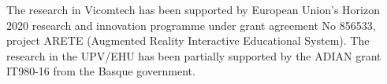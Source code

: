 \documentclass[10pt, a4paper, oneside]{article}
\begin{document}
{\selectfont
\begin{doi}
{\fontsize{9pt}{9pt}\selectfont{
10.3897/jucs.\textless SubmissionNumber\textgreater}}
\end{doi}}






%



\begin{Acknowledgements}
The research in Vicomtech has been supported by European Union’s Horizon 2020 research and innovation programme under grant agreement No 856533, project ARETE (Augmented Reality Interactive Educational System).
The research in the UPV/EHU has been partially supported by the ADIAN grant IT980-16 from the Basque government.
\end{Acknowledgements}



\fontsize{9pt}{10pt}\selectfont

\end{document}
